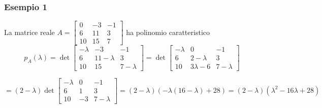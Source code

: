 \documentclass[12pt,a4paper,oneside]{article}
\begin{document}
\subsubsection*{Esempio 1}
La matrice reale $ A= \begin{bmatrix}
		0  & -3 & -1 \\
		6  & 11 & 3  \\
		10 & 15 & 7
	\end{bmatrix} $ ha polinomio caratteristico
\[
	p_A(\lambda)= \det
	\begin{bmatrix}
		-\lambda & -3         & -1        \\
		6        & 11-\lambda & 3         \\
		10       & 15         & 7-\lambda
	\end{bmatrix}
	= \det
	\begin{bmatrix}
		-\lambda & 0           & -1        \\
		6        & 2-\lambda   & 3         \\
		10       & 3 \lambda-6 & 7-\lambda
	\end{bmatrix}
\]

\[
	=(2-\lambda) \det
	\begin{bmatrix}
		-\lambda & 0  & -1        \\
		6        & 1  & 3         \\
		10       & -3 & 7-\lambda
	\end{bmatrix}
	=(2-\lambda)(-\lambda(16-\lambda)+28)=(2-\lambda)\left(\lambda^2-16 \lambda+28\right)
\]
\end{document}
